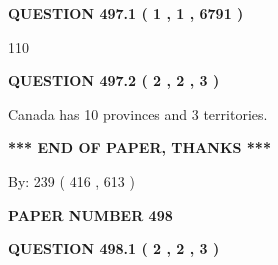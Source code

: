 \documentclass[12pt]{article}
\begin{document}
{\textbf{\Large{QUESTION
497.1 
 ( 1 , 1 , 6791 )
}}}
  
  
 
 
\noindent{}

110
 
 
  
\vspace{0.2in}
  
{\textbf{\Large{QUESTION
497.2 
 ( 2 , 2 , 3 )
}}}
  
  
 
 
\noindent{}
 
 
Canada has 10  provinces and 3 territories.
 
 
 
 
   
   
 \vspace{0.2in}
 
   
   
   
   
\vspace{1.0in} 
{\textbf{\large{ *** END OF PAPER, THANKS *** }}} 
   
   
\hspace{1.0in} By: 
 239 ( 416 ,  613 )
   
   
   
   
\newpage 
\setcounter{page}{ 
   498001 } 
   
   
   
   
 {\textbf{ \Large{ PAPER NUMBER  498  }}}
   
   
\vspace{0.2in}
   
   
   
   
   
   
 \vspace{0.2in}
 
 
 
 
   
   
  
\vspace{0.2in}
  
{\textbf{\Large{QUESTION
498.1 
 ( 2 , 2 , 3 )
}}}
  
  
 
 
\noindent{}
 
\end{document}
